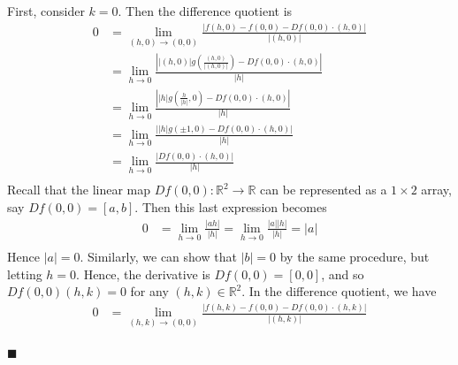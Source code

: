 \documentclass[12pt]{article}
\renewcommand{\qed}{\hfill$\blacksquare$}
\renewenvironment{proof}{\begin{addmargin}[1em]{0em}\begin{newproof}}{\end{newproof}\end{addmargin}\qed}
\begin{document}
\begin{proof}
\begin{itemize}
First, consider $k=0$. Then the difference quotient is
\begin{equation*}\begin{split}
0 & = \lim_{\left(h,0\right)\rightarrow \left(0,0\right)} \frac{\left| f\left(h,0\right) - f\left(0,0\right) - Df\left(0,0\right) \cdot \left(h,0\right)\right|}{\left| \left(h,0\right)\right|} \\
& = \lim_{h\rightarrow 0} \frac{\left| \left|\left(h,0\right)\right| g\left( \frac{\left(h,0\right)}{\left|\left(h,0\right)\right|}\right) - Df\left(0,0\right) \cdot \left(h,0\right)\right|}{\left| h\right|} \\
& = \lim_{h\rightarrow 0} \frac{\left| \left|h \right| g\left( \frac{h}{\left|h\right|}, 0\right) - Df\left(0,0\right) \cdot \left(h,0\right)\right|}{\left| h\right|} \\
& = \lim_{h\rightarrow 0} \frac{\left| \left|h \right| g\left( \pm 1, 0\right) - Df\left(0,0\right) \cdot \left(h,0\right)\right|}{\left| h\right|} \\
& = \lim_{h\rightarrow 0} \frac{\left| Df\left(0,0\right) \cdot \left(h,0\right)\right|}{\left| h\right|} \\
\end{split}\end{equation*}
Recall that the linear map $Df\left(0,0\right): \mathbb{R}^2 \rightarrow \mathbb{R}$ can be represented as a $1\times 2$ array, say $Df\left(0,0\right) = \left[a,b\right]$. Then this last expression becomes
\begin{equation*}\begin{split}
0 & = \lim_{h\rightarrow 0} \frac{\left| ah\right|}{\left| h\right|} =  \lim_{h\rightarrow 0} \frac{\left|a\right|\left|h\right|}{\left|h\right|} = \left| a\right| \\
\end{split}\end{equation*}
Hence $\left|a\right| = 0$. Similarly, we can show that $\left|b\right| = 0$ by the same procedure, but letting $h=0$. Hence, the derivative is $Df\left(0,0\right) = \left[0,0\right]$, and so $Df\left(0,0\right)\left(h,k\right) = 0$ for any $\left(h,k\right)\in \mathbb{R}^2$. In the difference quotient, we have
\begin{equation*}\begin{split}
0 & = \lim_{\left(h,k\right)\rightarrow \left(0,0\right)} \frac{\left| f\left(h,k\right) - f\left(0,0\right) - Df\left(0,0\right) \cdot \left(h,k\right)\right|}{\left| \left(h,k\right)\right|} \\

\end{split}
\end{equation*}
\end{itemize}
\end{proof}
\end{document}
